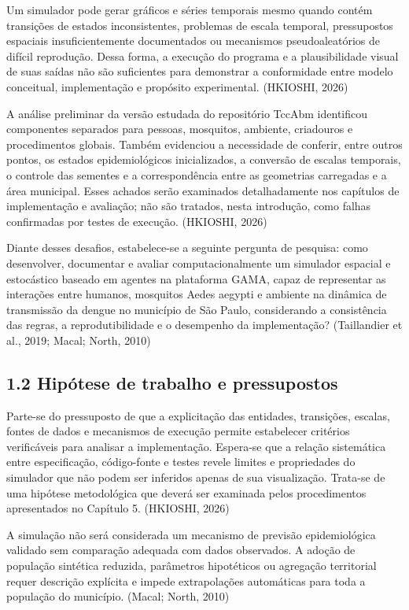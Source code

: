 Um simulador pode gerar gráficos e séries temporais mesmo quando contém
transições de estados inconsistentes, problemas de escala temporal,
pressupostos espaciais insuficientemente documentados ou mecanismos
pseudoaleatórios de difícil reprodução. Dessa forma, a execução do
programa e a plausibilidade visual de suas saídas não são suficientes
para demonstrar a conformidade entre modelo conceitual, implementação e
propósito experimental. (HKIOSHI, 2026)

A análise preliminar da versão estudada do repositório TccAbm
identificou componentes separados para pessoas, mosquitos, ambiente,
criadouros e procedimentos globais. Também evidenciou a necessidade de
conferir, entre outros pontos, os estados epidemiológicos inicializados,
a conversão de escalas temporais, o controle das sementes e a
correspondência entre as geometrias carregadas e a área municipal. Esses
achados serão examinados detalhadamente nos capítulos de implementação e
avaliação; não são tratados, nesta introdução, como falhas confirmadas
por testes de execução. (HKIOSHI, 2026)

Diante desses desafios, estabelece-se a seguinte pergunta de pesquisa:
como desenvolver, documentar e avaliar computacionalmente um simulador
espacial e estocástico baseado em agentes na plataforma GAMA, capaz de
representar as interações entre humanos, mosquitos Aedes aegypti e
ambiente na dinâmica de transmissão da dengue no município de São Paulo,
considerando a consistência das regras, a reprodutibilidade e o
desempenho da implementação? (Taillandier et al., 2019; Macal; North,
2010)

\subsection{1.2 Hipótese de trabalho e
pressupostos}\label{hipuxf3tese-de-trabalho-e-pressupostos}

Parte-se do pressuposto de que a explicitação das entidades, transições,
escalas, fontes de dados e mecanismos de execução permite estabelecer
critérios verificáveis para analisar a implementação. Espera-se que a
relação sistemática entre especificação, código-fonte e testes revele
limites e propriedades do simulador que não podem ser inferidos apenas
de sua visualização. Trata-se de uma hipótese metodológica que deverá
ser examinada pelos procedimentos apresentados no Capítulo 5. (HKIOSHI,
2026)

A simulação não será considerada um mecanismo de previsão epidemiológica
validado sem comparação adequada com dados observados. A adoção de
população sintética reduzida, parâmetros hipotéticos ou agregação
territorial requer descrição explícita e impede extrapolações
automáticas para toda a população do município. (Macal; North, 2010)

